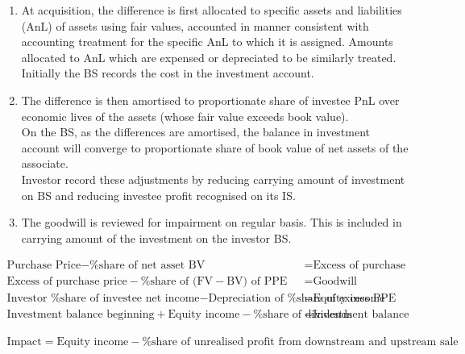 \begin{remark} 
\begin{enumerate}[label=\roman*.]
\setlength{\itemsep}{0pt}
\item At acquisition, the difference is first allocated to specific assets and liabilities (AnL) of assets using fair values, accounted in manner consistent with accounting treatment for the specific AnL to which it is assigned. Amounts allocated to AnL which are expensed or depreciated to be similarly treated. \\
Initially the BS records the cost in the investment account.
\item The difference is then amortised to proportionate share of investee PnL over economic lives of the assets (whose fair value exceeds book value).\\
On the BS, as the differences are amortised, the balance in investment account will converge to proportionate share of book value of net assets of the associate.\\
Investor record these adjustments by reducing carrying amount of investment on BS and reducing investee profit recognised on its IS.
\item The goodwill is reviewed for impairment on regular basis. This is included in carrying amount of the investment on the investor BS.
\end{enumerate}
\end{remark}

\begin{method} 
\begin{align}
\text{Purchase Price} - \text{\% share of net asset BV} &= \text{Excess of purchase price} \nonumber \\
\text{Excess of purchase price} - \text{\% share of (FV} -  \text{BV) of PPE} &= \text{Goodwill} \nonumber \\
\text{Investor \% share of investee net income} - \text{Depreciation of \% share of excess PPE} &= \text{Equity income} \nonumber \\
\text{Investment balance beginning} + \text{Equity income} - \text{\% share of dividends} &= \text{Investment balance end} \nonumber
\end{align}
\end{method}

\begin{method} 
\begin{align}
\text{Impact} = \text{Equity income} - \text{\% share of unrealised profit from downstream and upstream sale} \nonumber
\end{align}
\end{method}

